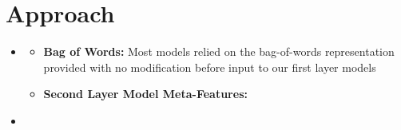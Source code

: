 \section{Approach}
\medskip
\begin{itemize}

    \item {}
    \begin{itemize}
        \item \textbf{Bag of Words:} Most models relied on the bag-of-words representation provided with no modification before input to our first layer models
        \item \textbf{Second Layer Model Meta-Features:} %
    \end{itemize}

    \item {}


\end{itemize}
